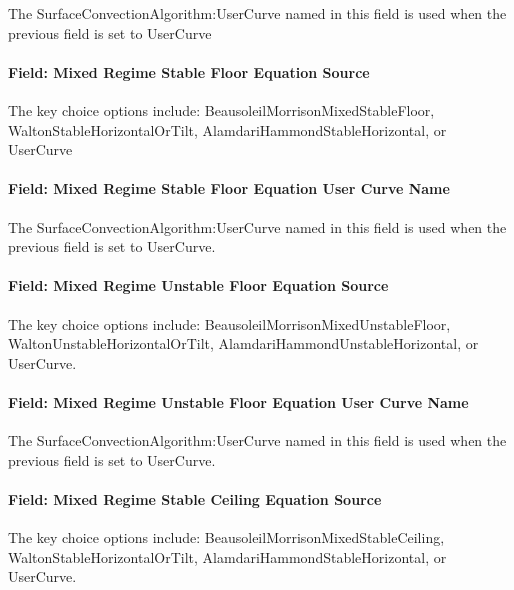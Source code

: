 The SurfaceConvectionAlgorithm:UserCurve named in this field is used when the previous field is set to UserCurve

\paragraph{Field: Mixed Regime Stable Floor Equation Source}\label{field-mixed-regime-stable-floor-equation-source}

The key choice options include: BeausoleilMorrisonMixedStableFloor, WaltonStableHorizontalOrTilt, AlamdariHammondStableHorizontal, or UserCurve

\paragraph{Field: Mixed Regime Stable Floor Equation User Curve Name}\label{field-mixed-regime-stable-floor-equation-user-curve-name}

The SurfaceConvectionAlgorithm:UserCurve named in this field is used when the previous field is set to UserCurve.

\paragraph{Field: Mixed Regime Unstable Floor Equation Source}\label{field-mixed-regime-unstable-floor-equation-source}

The key choice options include: BeausoleilMorrisonMixedUnstableFloor, WaltonUnstableHorizontalOrTilt, AlamdariHammondUnstableHorizontal, or UserCurve.

\paragraph{Field: Mixed Regime Unstable Floor Equation User Curve Name}\label{field-mixed-regime-unstable-floor-equation-user-curve-name}

The SurfaceConvectionAlgorithm:UserCurve named in this field is used when the previous field is set to UserCurve.

\paragraph{Field: Mixed Regime Stable Ceiling Equation Source}\label{field-mixed-regime-stable-ceiling-equation-source}

The key choice options include: BeausoleilMorrisonMixedStableCeiling, WaltonStableHorizontalOrTilt, AlamdariHammondStableHorizontal, or UserCurve.

